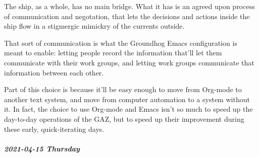 \documentclass[11pt]{article}
\begin{document}
\begin{itemize}
The ship, as a whole, has no main bridge. What it has is an agreed upon process of communication and negotation, that lets the decisions and actions inside the ship flow in a stigmergic mimickry of the currents outside.

That sort of communication is what the Groundhog Emacs configuration is meant to enable: letting people record the information that'll let them communicate with their work groups, and letting work groups communicate that information between each other.

Part of this choice is because it'll be easy enough to move from Org-mode to another text system, and move from computer automation to a system without it. In fact, the choice to use Org-mode and Emacs isn't so much to speed up the day-to-day operations of the GAZ, but to speed up their improvement during these early, quick-iterating days.
\end{itemize}
\subparagraph*{2021-04-15 Thursday}
\label{sec:org909348c}
\end{document}
